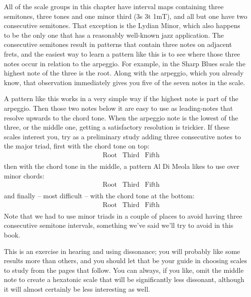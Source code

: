 \documentclass[english]{./gbook}
\begin{document}
\begin{large}
All of the scale groups in this chapter have interval maps containing three semitones, three tones and one minor third (3s 3t 1mT), and all but one have two consecutive semitones. That exception is the Lydian Minor, which also happens to be the only one that has a reasonably well-known jazz application. The consecutive semitones result in patterns that contain three notes on adjacent frets, and the easiest way to learn a pattern like this is to see where those three notes occur in relation to the arpeggio. For example, in the Sharp Blues scale the highest note of the three is the root. Along with the arpeggio, which you already know, that observation immediately gives you five of the seven notes in the scale.

A pattern like this works in a very simple way if the highest note is part of the arpeggio. Then those two notes below it are easy to use as leading-notes that resolve upwards to the chord tone. When the arpeggio note is the lowest of the three, or the middle one, getting a satisfactory resolution is trickier. If these scales interest you, try as a preliminary study adding three consecutive notes to the major triad, first with the chord tone on top:
\[
\begin{array}{ccc}
	&%
	&%
	\text{Root} & \text{Third} & \text{Fifth} \\
\end{array}
\]
then with the chord tone in the middle, a pattern Al Di Meola likes to use over minor chords:
\[
\begin{array}{ccc}
	&%
	&%
	\text{Root} & \text{Third} & \text{Fifth} \\
\end{array}
\]
and finally -- most difficult -- with the chord tone at the bottom:
\[
\begin{array}{ccc}
	&%
	&%
	\text{Root} & \text{Third} & \text{Fifth} \\
\end{array}
\]
Note that we had to use minor triads in a couple of places to avoid having three consecutive semitone intervals, something we've said we'll try to avoid in this book.

This is an exercise in hearing and using dissonance; you will probably like some results more than others, and you should let that be your guide in choosing scales to study from the pages that follow. You can always, if you like, omit the middle note to create a hexatonic scale that will be significantly less dissonant, although it will almost certainly be less interesting as well.


\end{large}
\end{document}
